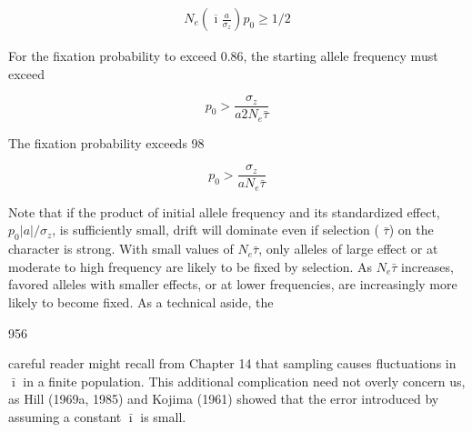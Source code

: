 \documentclass{article}
\begin{document}
\begin{equation}
\begin{align*}N_e\left(\overline{\imath}\frac{a}{\sigma_z}\right)p_0\geq1/2\end{align*}
\tag{26.3a}
\label{eq:26_3a}
\end{equation}

For the fixation probability to exceed 0.86, the starting allele frequency must exceed

\begin{equation}
p_{0}>\frac{\sigma_{z}}{a2N_{e}\bar{\tau}}
\tag{26.3b}
\label{eq:26_3b}
\end{equation}

The fixation probability exceeds 98%

\begin{equation}
p_{0}>\frac{\sigma_{z}}{a N_{e}\bar{\tau}}
\tag{26.4}
\label{eq:26_4}
\end{equation}

Note that if the product of initial allele frequency and its standardized effect,  $ p_0 | a | / \sigma_z $, is sufficiently small, drift will dominate even if selection ( $ \bar{\tau} $) on the character is strong. With small values of  $ N_e \bar{\tau} $, only alleles of large effect or at moderate to high frequency are likely to be fixed by selection. As  $ N_e \bar{\tau} $ increases, favored alleles with smaller effects, or at lower frequencies, are increasingly more likely to become fixed. As a technical aside, the

956

careful reader might recall from Chapter 14 that sampling causes fluctuations in  $ \bar{\imath} $ in a finite population. This additional complication need not overly concern us, as Hill (1969a, 1985) and Kojima (1961) showed that the error introduced by assuming a constant  $ \bar{\imath} $ is small.
\end{document}
